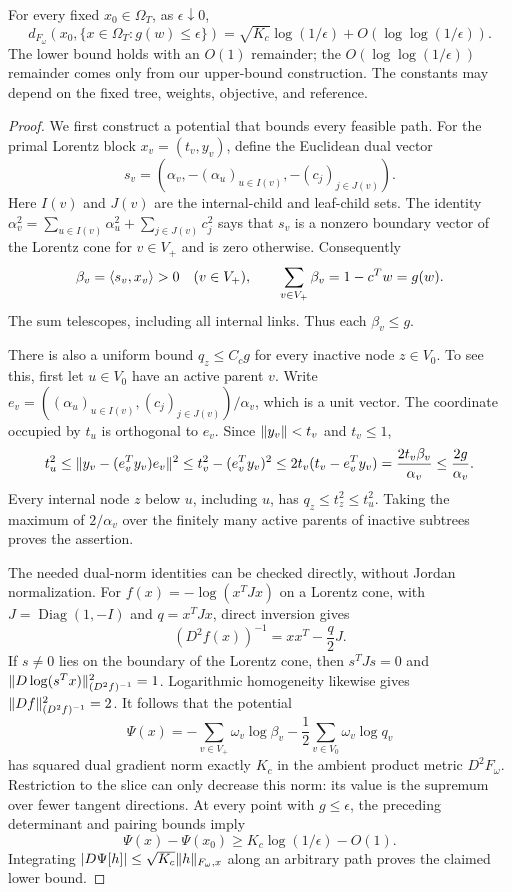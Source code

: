 \begin{theorem}\label{thm:tree-exact-distance}
For every fixed $x_0\in\Omega_T$, as $\epsilon\downarrow0$,
\begin{equation}\label{eq:tree-exact-distance}
 d_{F_\omega}(x_0,\{x\in\Omega_T:g(w)\leq\epsilon\})
 =\sqrt{K_c}\log(1/\epsilon)+O(\log\log(1/\epsilon)).
\end{equation}
The lower bound holds with an $O(1)$ remainder; the
$O(\log\log(1/\epsilon))$ remainder comes only from our upper-bound
construction.  The constants may depend on the fixed tree, weights,
objective, and reference.
\end{theorem}
\begin{proof}
We first construct a potential that bounds every feasible path.
For the primal Lorentz block $x_v=(t_v,y_v)$, define the Euclidean dual vector
\[
 s_v=(\alpha_v,-(\alpha_u)_{u\in I(v)},-(c_j)_{j\in J(v)}).
\]
Here $I(v)$ and $J(v)$ are the internal-child and leaf-child sets.
The identity $\alpha_v^2=\sum_{u\in I(v)}\alpha_u^2+
\sum_{j\in J(v)}c_j^2$ says that $s_v$ is a nonzero boundary vector of the Lorentz cone for
$v\in V_+$ and is zero otherwise.  Consequently
\[
 \beta_v=\langle s_v,x_v\rangle>0\quad(v\in V_+),\qquad
 \sum_{v\in V_+}\beta_v=1-c^Tw=g(w).
\]
The sum telescopes, including all internal links.  Thus each
$\beta_v\leq g$.

There is also a uniform bound $q_z\leq C_c g$ for every inactive node
$z\in V_0$.  To see this, first let $u\in V_0$ have an active parent
$v$.  Write $e_v=((\alpha_u)_{u\in I(v)},(c_j)_{j\in J(v)})/\alpha_v$,
which is a unit vector.  The coordinate occupied by $t_u$ is orthogonal
to $e_v$.  Since $\lVert y_v\rVert<t_v$ and $t_v\leq1$,
\[
 t_u^2\leq\lVert y_v-(e_v^Ty_v)e_v\rVert^2
 \leq t_v^2-(e_v^Ty_v)^2
 \leq 2t_v(t_v-e_v^Ty_v)
 =\frac{2t_v\beta_v}{\alpha_v}\leq\frac{2g}{\alpha_v}.
\]
Every internal node $z$ below $u$, including $u$, has
$q_z\leq t_z^2\leq t_u^2$.  Taking the maximum of $2/\alpha_v$ over the finitely many
active parents of inactive subtrees proves the assertion.

The needed dual-norm identities can be checked directly, without
Jordan normalization.  For $f(x)=-\log(x^TJx)$ on a Lorentz cone,
with $J=\operatorname{Diag}(1,-I)$ and $q=x^TJx$, direct inversion gives
\[
 (D^2f(x))^{-1}=xx^T-\frac q2J.
\]
If $s\ne0$ lies on the boundary of the Lorentz cone, then $s^TJs=0$ and
$\lVert D\log(s^Tx)\rVert_{(D^2f)^{-1}}^2=1$.
Logarithmic homogeneity likewise gives
$\lVert Df\rVert_{(D^2f)^{-1}}^2=2$.
It follows that the potential
\[
 \Psi(x)=-\sum_{v\in V_+}\omega_v\log\beta_v
          -\frac12\sum_{v\in V_0}\omega_v\log q_v
\]
has squared dual gradient norm exactly $K_c$ in the ambient product
metric $D^2F_\omega$.  Restriction to the slice can only
decrease this norm: its value is the supremum over fewer tangent directions.
At every point with $g\leq\epsilon$, the preceding determinant and
pairing bounds imply
\[
 \Psi(x)-\Psi(x_0)\geq K_c\log(1/\epsilon)-O(1).
\]
Integrating $|D\Psi[h]|\leq\sqrt{K_c}\lVert h\rVert_{F_\omega,x}$
along an arbitrary path proves the claimed lower bound.


\end{proof}
